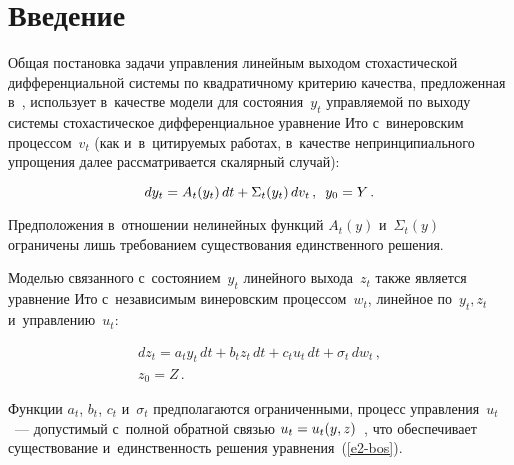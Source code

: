 

\vspace*{-4pt}



\thispagestyle{headings}

\begin{multicols}{2}

\label{st\stat}


\section{Введение}

     Общая постановка задачи управления линейным выходом 
стохастической дифференциальной системы по квадратичному критерию 
качества, предложенная в~\cite{1-bos}, использует в~качестве модели для 
состояния~$y_t$ управляемой по выходу системы стохастическое 
дифференциальное уравнение Ито с~винеровским процессом~$v_t$ (как 
и~в~цитируемых работах, в~качестве непринципиального упрощения далее 
рассматривается скалярный случай):

\vspace*{2pt}

\noindent
     \begin{equation}
     dy_t=A_t(y_t)\,dt+\Sigma_t(y_t)\,dv_t\,,\enskip y_0=Y\,.
     \label{e1-bos}
     \end{equation}
     
     \vspace*{-2pt}
     
     Предположения в~отношении нелинейных функций $A_t(y)$ 
и~$\Sigma_t(y)$ ограничены лишь требованием существования единственного 
решения.
     
     Моделью связанного с~состоянием~$y_t$ линейного выхода~$z_t$ 
также является уравнение Ито с~независимым винеровским 
процессом~$w_t$, линейное по~$y_t, z_t$ и~управлению~$u_t$:

\noindent
     \begin{multline}
     dz_t=a_t y_t\,dt +b_t z_t\,dt +c_t u_t\,dt+\sigma_t\,dw_t\,,\\
     z_0=Z\,.
     \label{e2-bos}
     \end{multline}
     
     Функции $a_t$, $b_t$, $c_t$ и~$\sigma_t$ предполагаются 
ограниченными, процесс управления~$u_t$~--- допустимый с~полной 
обратной связью $u_t\hm= u_t(y,z)$~\cite{5-bos}, что обеспечивает 
существование и~единственность решения уравнения~(\ref{e2-bos}). 


\end{multicols}
